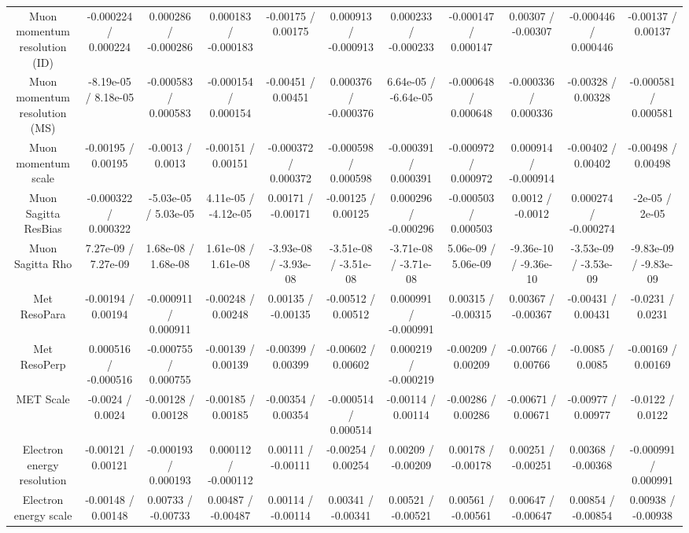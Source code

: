 \begin{table}[htbp]
\begin{center}
\begin{tabular}{|c|c|c|c|c|c|c|c|c|c|c|}
  Muon momentum resolution (ID) & -0.000224 / 0.000224 & 0.000286 / -0.000286 & 0.000183 / -0.000183 & -0.00175 / 0.00175 & 0.000913 / -0.000913 & 0.000233 / -0.000233 & -0.000147 / 0.000147 & 0.00307 / -0.00307 & -0.000446 / 0.000446 & -0.00137 / 0.00137 \\ 
  Muon momentum resolution (MS) & -8.19e-05 / 8.18e-05 & -0.000583 / 0.000583 & -0.000154 / 0.000154 & -0.00451 / 0.00451 & 0.000376 / -0.000376 & 6.64e-05 / -6.64e-05 & -0.000648 / 0.000648 & -0.000336 / 0.000336 & -0.00328 / 0.00328 & -0.000581 / 0.000581 \\ 
  Muon momentum scale & -0.00195 / 0.00195 & -0.0013 / 0.0013 & -0.00151 / 0.00151 & -0.000372 / 0.000372 & -0.000598 / 0.000598 & -0.000391 / 0.000391 & -0.000972 / 0.000972 & 0.000914 / -0.000914 & -0.00402 / 0.00402 & -0.00498 / 0.00498 \\ 
  Muon Sagitta ResBias & -0.000322 / 0.000322 & -5.03e-05 / 5.03e-05 & 4.11e-05 / -4.12e-05 & 0.00171 / -0.00171 & -0.00125 / 0.00125 & 0.000296 / -0.000296 & -0.000503 / 0.000503 & 0.0012 / -0.0012 & 0.000274 / -0.000274 & -2e-05 / 2e-05 \\ 
  Muon Sagitta Rho & 7.27e-09 / 7.27e-09 & 1.68e-08 / 1.68e-08 & 1.61e-08 / 1.61e-08 & -3.93e-08 / -3.93e-08 & -3.51e-08 / -3.51e-08 & -3.71e-08 / -3.71e-08 & 5.06e-09 / 5.06e-09 & -9.36e-10 / -9.36e-10 & -3.53e-09 / -3.53e-09 & -9.83e-09 / -9.83e-09 \\ 
  Met ResoPara & -0.00194 / 0.00194 & -0.000911 / 0.000911 & -0.00248 / 0.00248 & 0.00135 / -0.00135 & -0.00512 / 0.00512 & 0.000991 / -0.000991 & 0.00315 / -0.00315 & 0.00367 / -0.00367 & -0.00431 / 0.00431 & -0.0231 / 0.0231 \\ 
  Met ResoPerp & 0.000516 / -0.000516 & -0.000755 / 0.000755 & -0.00139 / 0.00139 & -0.00399 / 0.00399 & -0.00602 / 0.00602 & 0.000219 / -0.000219 & -0.00209 / 0.00209 & -0.00766 / 0.00766 & -0.0085 / 0.0085 & -0.00169 / 0.00169 \\ 
  MET Scale & -0.0024 / 0.0024 & -0.00128 / 0.00128 & -0.00185 / 0.00185 & -0.00354 / 0.00354 & -0.000514 / 0.000514 & -0.00114 / 0.00114 & -0.00286 / 0.00286 & -0.00671 / 0.00671 & -0.00977 / 0.00977 & -0.0122 / 0.0122 \\ 
  Electron energy resolution & -0.00121 / 0.00121 & -0.000193 / 0.000193 & 0.000112 / -0.000112 & 0.00111 / -0.00111 & -0.00254 / 0.00254 & 0.00209 / -0.00209 & 0.00178 / -0.00178 & 0.00251 / -0.00251 & 0.00368 / -0.00368 & -0.000991 / 0.000991 \\ 
  Electron energy scale & -0.00148 / 0.00148 & 0.00733 / -0.00733 & 0.00487 / -0.00487 & 0.00114 / -0.00114 & 0.00341 / -0.00341 & 0.00521 / -0.00521 & 0.00561 / -0.00561 & 0.00647 / -0.00647 & 0.00854 / -0.00854 & 0.00938 / -0.00938 \\ 

\end{tabular}
\end{center}
\end{table}
